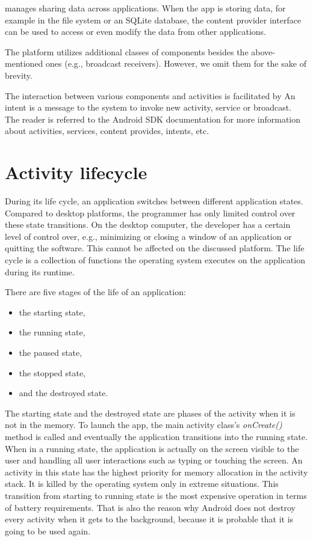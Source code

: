  manages sharing data across applications.
When the app is storing data, for example in the file system or an SQLite database, the content provider interface can be used to access or even modify the data from other applications. 

The platform utilizes additional classes of components besides the above-mentioned ones (e.g., broadcast receivers). 
However, we omit them for the sake of brevity. 

The interaction between various components and activities is facilitated by  
An intent is a message to the system to invoke new activity, service or broadcast.
The reader is referred to the Android SDK documentation for more information about activities, services, content provides, intents, etc. 

\section{Activity lifecycle}
\label{sec:lifecycle}

During its life cycle, an application switches between different application states.
Compared to desktop platforms, the programmer has only limited control over these state transitions.
On the desktop computer, the developer has a certain level of control over, e.g., minimizing or closing a window of an application or quitting the software. 
This cannot be affected on the discussed platform. 
The life cycle is a collection of functions the operating system executes on the application during its runtime. 

There are five stages of the life of an application:
\begin{itemize}
\item the starting state,
\item the running state,
\item the paused state,
\item the stopped state,
\item and the destroyed state.
\end{itemize}

The starting state and the destroyed state are phases of the activity when it is not in the memory.
To launch the app, the main activity class's \emph{onCreate()} method is called and eventually the application transitions into the running state. %
When in a running state, the application is actually on the screen visible to the user and handling all user interactions such as typing or touching the screen. 
An activity in this state has the highest priority for memory allocation in the activity stack.
It is killed by the operating system only in extreme situations.
This transition from starting to running state is the most expensive operation in terms of battery requirements.
That is also the reason why Android does not destroy every activity when it gets to the background, 
because it is probable that it is going to be used again. 

